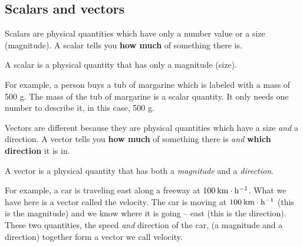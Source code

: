 \subsection*{Scalars and vectors}
            \nopagebreak

Scalars are physical quantities which have only a number value or a size (magnitude). A scalar tells you \textbf{how much} of something there is. 

 {A scalar is a physical quantity that has only a magnitude (size).  } 

For example, a person buys a tub of margarine which is labeled with a mass of 500 g. The mass of the tub of margarine is a scalar quantity. It only needs one number to describe it, in this case, 500 g.  

Vectors are different because they are physical quantities which have a size \textit{and} a direction. A vector tells you \textbf{how much} of something there is \textit{and} \textbf{which direction} it is in.

 {A vector is a physical quantity that has both a \textit{magnitude} and a \textit{direction}.  }



 

For example, a car is traveling east along a freeway at $100\phantom{\rule{2pt}{0ex}}\text{km}\ensuremath{\cdot}\text{h}{}^{-1}$. What we have here is a vector called the velocity. The car is moving at $100\phantom{\rule{2pt}{0ex}}\text{km}\ensuremath{\cdot}\text{h}{}^{-1}$ (this is the magnitude) and we know where it is going -- east (this is the direction). These two quantities, the speed \textit{and} direction of the car, (a magnitude and a direction) together form a vector we call velocity.

